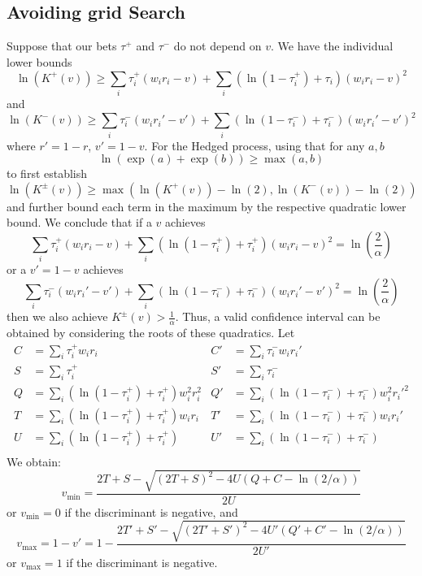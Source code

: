 \subsection{Avoiding grid Search}
Suppose that our bets $\tau^+$ and $\tau^-$ do not depend on $v$.
We have the individual lower bounds
\[
\ln(K^{+}(v)) \geq \sum_i \tau_i^+ (w_i r_i -v) + \sum_i (\ln(1-\tau_i^+)+\tau_i)(w_i r_i -v)^2
\]
and
\[
\ln(K^{-}(v)) \geq \sum_i \tau_i^- (w_i r_i' -v') + \sum_i (\ln(1-\tau_i^-)+\tau_i^-)(w_i r_i' -v')^2
\]
where $r'=1-r$, $v'=1-v$.
For the Hedged process, using that for any $a,b$
\[
\ln\left(\exp(a)+\exp(b)\right)\geq \max(a,b)
\]
to first establish
\[
\ln(K^\pm(v)) \geq \max(\ln(K^+(v))-\ln(2),\ln(K^-(v))-\ln(2))
\]
and further bound each term in the maximum by the respective 
quadratic lower bound. We conclude that
if a $v$ achieves 
\[
\sum_i \tau_i^+ (w_i r_i -v) + \sum_i (\ln(1-\tau_i^+)+\tau_i^+)(w_i r_i -v)^2 = \ln\left(\frac{2}{\alpha}\right)
\]
or a $v'=1-v$ achieves 
\[
\sum_i \tau_i^- (w_i r_i'-v') + \sum_i (\ln(1-\tau_i^-)+\tau_i^-)(w_i r_i' - v')^2
=\ln\left(\frac{2}{\alpha}\right)
\]
then we also achieve $K^\pm(v) > \frac{1}{\alpha}$. 
Thus, a valid confidence interval can be obtained by considering
the roots of these quadratics.  Let
\begin{align*}
C&=\sum_i \tau_i^+ w_i r_i & 
C'&=\sum_i \tau_i^- w_i r_i'\\
S&=\sum_i \tau_i^+ & 
S'&=\sum_i \tau_i^- \\
Q&=\sum_i \left(\ln(1-\tau_i^+)+\tau_i^+\right) w_i^2 r_i^2 &
Q'&=\sum_i \left(\ln(1-\tau_i^-)+\tau_i^-\right) w_i^2 r_i'^2\\
T&=\sum_i \left(\ln(1-\tau_i^+)+\tau_i^+\right) w_ir_i &
T'&=\sum_i \left(\ln(1-\tau_i^-)+\tau_i^-\right) w_ir_i'\\
U&=\sum_i \left(\ln(1-\tau_i^+)+\tau_i^+\right) &
U'&=\sum_i \left(\ln(1-\tau_i^-)+\tau_i^-\right)\\
\end{align*}
We obtain:
\[
v_{\min}= \frac{2T+S-\sqrt{(2T+S)^2-4U(Q+C-\ln(2/\alpha))}}{2U}
\]
or $v_{\min}=0$ if the discriminant is negative, 
and
\[
v_{\max}=1-v' = 1-\frac{2T'+S'-\sqrt{(2T'+S')^2-4U'(Q'+C'-\ln(2/\alpha))}}{2U'}
\]
or $v_{\max}=1$ if the discriminant is negative.
